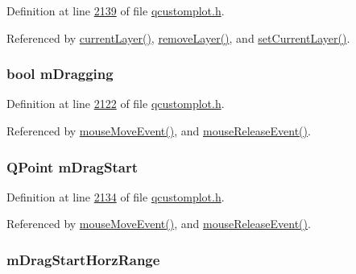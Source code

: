 Definition at line \hyperlink{a00116_source_l02139}{2139} of file \hyperlink{a00116_source}{qcustomplot.\+h}.



Referenced by \hyperlink{a00115_source_l06984}{current\+Layer()}, \hyperlink{a00115_source_l07087}{remove\+Layer()}, and \hyperlink{a00115_source_l07018}{set\+Current\+Layer()}.

\hypertarget{a00116_ad1273fad7e12b0f61819343368778928}{
\subsubsection[{m\+Dragging}]{\setlength{\rightskip}{0pt plus 5cm}bool m\+Dragging}}\label{a00116_ad1273fad7e12b0f61819343368778928}


Definition at line \hyperlink{a00116_source_l02122}{2122} of file \hyperlink{a00116_source}{qcustomplot.\+h}.



Referenced by \hyperlink{a00115_source_l07639}{mouse\+Move\+Event()}, and \hyperlink{a00115_source_l07691}{mouse\+Release\+Event()}.

\hypertarget{a00116_a23a3ce3b031eef6349252229446f3665}{
\subsubsection[{m\+Drag\+Start}]{\setlength{\rightskip}{0pt plus 5cm}Q\+Point m\+Drag\+Start}}\label{a00116_a23a3ce3b031eef6349252229446f3665}


Definition at line \hyperlink{a00116_source_l02134}{2134} of file \hyperlink{a00116_source}{qcustomplot.\+h}.



Referenced by \hyperlink{a00115_source_l07639}{mouse\+Move\+Event()}, and \hyperlink{a00115_source_l07691}{mouse\+Release\+Event()}.

\hypertarget{a00116_a3b64958e75f713e9aa5f849e0284599e}{
\subsubsection[{m\+Drag\+Start\+Horz\+Range}]{ m\+Drag\+Start\+Horz\+Range}}\label{a00116_a3b64958e75f713e9aa5f849e0284599e}


